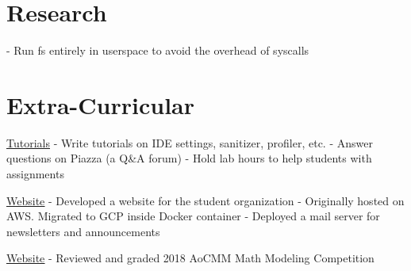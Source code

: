 \documentclass[letterpaper]{twentysecondcv} %
\begin{document}
\section{Research}

\begin{twenty} %
    {}
    {
     - Run fs entirely in userspace to avoid the overhead of syscalls
     }
\end{twenty}

\section{Extra-Curricular}

\begin{twenty} %
    {
      \href{https://shawnzhong.com/#tutorials}{\underline{Tutorials}}
    }
    {
     - Write tutorials on IDE settings, sanitizer, profiler, etc. \newline
     - Answer questions on Piazza (a Q\&A forum) \newline
     - Hold lab hours to help students with assignments
     }
    
    {\href{http://badgermentorship.com}{\underline{Website}}}
    {
     - Developed a website for the student organization \newline
     - Originally hosted on AWS. Migrated to GCP inside Docker container\newline
     - Deployed a mail server for newsletters and announcements
    }
    
    {\href{https://aocmm.org/officer-team}{\underline{Website}}}
    {
     - Reviewed and graded 2018 AoCMM Math Modeling Competition
    }
\end{twenty}




\end{document}
